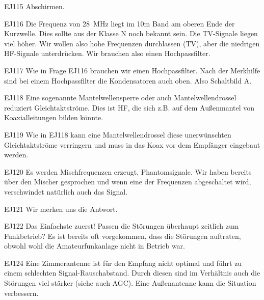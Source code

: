 \begin{sol}{EJ115}
Abschirmen.
\end{sol}


\begin{sol}{EJ116}
Die Frequenz von \SI{28} {\mega\hertz } liegt im 10m Band am oberen Ende der Kurzwelle. Dies sollte aus der Klasse N noch bekannt sein. Die TV-Signale liegen viel höher. Wir wollen also hohe Frequenzen durchlassen (TV), aber die niedrigen HF-Signale unterdrücken. Wir brauchen also einen Hochpassfilter.
\end{sol}


\begin{sol}{EJ117}
Wie in Frage EJ116 brauchen wir einen Hochpassfilter. Nach der Merkhilfe sind bei einem Hochpassfilter die Kondensatoren auch oben. Also Schaltbild A.
\end{sol}

\begin{sol}{EJ118}
Eine sogenannte Mantelwellensperre oder auch Mantelwellendrossel reduziert Gleichtaktströme. Dies ist HF, die sich z.B. auf dem Außenmantel von Koaxialleitungen bilden könnte.
\end{sol}

\begin{sol}{EJ119}
Wie in EJ118 kann eine Mantelwellendrossel diese unerwünschten Gleichtaktströme verringern und muss in das Koax vor dem Empfänger eingebaut werden.
\end{sol}


\begin{sol}{EJ120}
Es werden Mischfrequenzen erzeugt, Phantomsignale. Wir haben bereits über den Mischer gesprochen und wenn eine der Frequenzen abgeschaltet wird, verschwindet natürlich auch das Signal.
\end{sol}

\begin{sol}{EJ121}
Wir merken uns die Antwort.
\end{sol}

\begin{sol}{EJ122}
Das Einfachste zuerst! Passen die Störungen überhaupt zeitlich zum Funkbetrieb?
Es ist bereits oft vorgekommen, dass die Störungen auftraten, obwohl wohl die Amateurfunkanlage nicht in Betrieb war.
\end{sol}

\begin{sol}{EJ124}
Eine Zimmerantenne ist für den Empfang nicht optimal und führt zu einem schlechten Signal-Rauschabstand. Durch diesen sind im Verhältnis auch die Störungen viel stärker (siehe auch AGC). Eine Außenantenne kann die Situation verbessern.
\end{sol}

